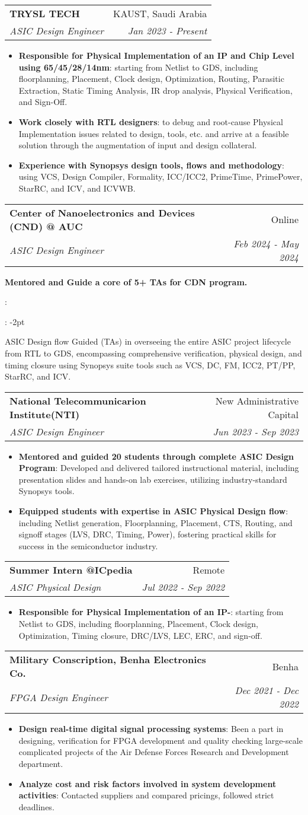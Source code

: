 \documentclass[a4paper,20pt]{article}
\makeatletter
\newcommand{\resumeItem}[2]{
	\item\small{
		\textbf{#1}{: #2 \vspace{-2pt}}
	}
}
\newcommand{\resumeSubheading}[4]{
	\vspace{-1pt}\item
	\begin{tabular*}{0.97\textwidth}{l@{\extracolsep{\fill}}r}
		\textbf{#1} & #2 \\
		\textit{#3} & \textit{#4} \\
	\end{tabular*}\vspace{-5pt}
}
\newcommand{\resumeItemListStart}{\begin{itemize}}
\newcommand{\resumeItemListEnd}{\end{itemize}\vspace{-5pt}}
\makeatother
\begin{document}
	\resumeSubheading{TRYSL TECH}{KAUST, Saudi Arabia}
	{ASIC Design Engineer}{Jan 2023 - Present}
	\resumeItemListStart
		\resumeItem{Responsible for Physical Implementation of an IP and Chip Level using 65/45/28/14nm}
	{ starting from Netlist to GDS, including floorplanning, Placement, Clock design, Optimization, Routing, Parasitic Extraction, Static Timing Analysis, IR drop analysis, Physical Verification, and Sign-Off.}
	\resumeItem{Work closely with RTL designers}
	{to debug and root-cause Physical Implementation issues related to design, tools, etc. and arrive at a feasible solution through the augmentation of input and design collateral.}
	\resumeItem{Experience with Synopsys design tools, flows and methodology}
	{using VCS, Design Compiler, Formality, ICC/ICC2, PrimeTime, PrimePower, StarRC, and ICV, and ICVWB.}
	\resumeItemListEnd
	
		\resumeSubheading{Center of Nanoelectronics and Devices (CND) @ AUC}{Online}
	{ASIC Design Engineer}{Feb 2024 - May 2024}
	\resumeItemListStart
	\resumeItem{Mentored and Guide a core of 5+ TAs for CDN program.}

	\resumeItem{ASIC Design flow}
	{Guided (TAs) in overseeing the entire ASIC project lifecycle from RTL to GDS, encompassing comprehensive verification, physical design, and timing closure using Synopsys suite tools such as VCS, DC, FM, ICC2, PT/PP, StarRC, and ICV.}
	\resumeItemListEnd
	
	\resumeSubheading{National Telecommunicarion Institute(NTI)}{New Administrative Capital}
	{ASIC Design Engineer}{Jun 2023 - Sep 2023}
	\resumeItemListStart
	\resumeItem{Mentored and guided 20 students through complete ASIC Design Program}
	{Developed and delivered tailored instructional material, including presentation slides and hands-on lab exercises, utilizing industry-standard Synopsys tools.}
	\resumeItem{Equipped students with expertise in ASIC Physical Design flow}
	{including Netlist generation, Floorplanning, Placement, CTS, Routing, and signoff stages (LVS, DRC, Timing, Power), fostering practical skills for success in the semiconductor industry.}
	\resumeItemListEnd
	
	\resumeSubheading{Summer Intern @ICpedia}{Remote}
	{ASIC Physical Design}{Jul 2022 - Sep 2022}
	\resumeItemListStart
	\resumeItem{Responsible for Physical Implementation of an IP-}
	{starting from Netlist to GDS, including floorplanning,
		Placement, Clock design, Optimization, Timing closure, DRC/LVS, LEC, ERC, and sign-off.}
	\resumeItemListEnd
	
	\resumeSubheading{Military Conscription, Benha Electronics Co.}{Benha}
	{FPGA Design Engineer}{Dec 2021 - Dec 2022}
	\resumeItemListStart
	\resumeItem{Design real-time digital signal processing systems}
	{Been a part in designing, verification for FPGA development and quality checking large-scale complicated projects of the Air Defense Forces Research and Development department.}
	\resumeItem{Analyze cost and risk factors involved in system development activities}
	{Contacted suppliers and compared pricings, followed strict deadlines.}
	\resumeItemListEnd
\end{document}
